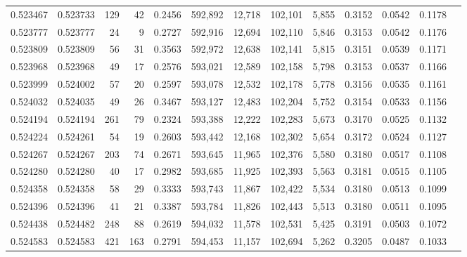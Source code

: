 \begin{tabular}{rrrrrrrrrrrrr}
0.523467 & 0.523733 &   129 &    42 &                                     0.2456 & 592,892 &  12,718 & 102,101 &   5,855 & 0.3152 & 0.0542 & 0.1178 \\
0.523777 & 0.523777 &    24 &     9 &                                     0.2727 & 592,916 &  12,694 & 102,110 &   5,846 & 0.3153 & 0.0542 & 0.1176 \\
0.523809 & 0.523809 &    56 &    31 &                                     0.3563 & 592,972 &  12,638 & 102,141 &   5,815 & 0.3151 & 0.0539 & 0.1171 \\
0.523968 & 0.523968 &    49 &    17 &                                     0.2576 & 593,021 &  12,589 & 102,158 &   5,798 & 0.3153 & 0.0537 & 0.1166 \\
0.523999 & 0.524002 &    57 &    20 &                                     0.2597 & 593,078 &  12,532 & 102,178 &   5,778 & 0.3156 & 0.0535 & 0.1161 \\
0.524032 & 0.524035 &    49 &    26 &                                     0.3467 & 593,127 &  12,483 & 102,204 &   5,752 & 0.3154 & 0.0533 & 0.1156 \\
0.524194 & 0.524194 &   261 &    79 &                                     0.2324 & 593,388 &  12,222 & 102,283 &   5,673 & 0.3170 & 0.0525 & 0.1132 \\
0.524224 & 0.524261 &    54 &    19 &                                     0.2603 & 593,442 &  12,168 & 102,302 &   5,654 & 0.3172 & 0.0524 & 0.1127 \\
0.524267 & 0.524267 &   203 &    74 &                                     0.2671 & 593,645 &  11,965 & 102,376 &   5,580 & 0.3180 & 0.0517 & 0.1108 \\
0.524280 & 0.524280 &    40 &    17 &                                     0.2982 & 593,685 &  11,925 & 102,393 &   5,563 & 0.3181 & 0.0515 & 0.1105 \\
0.524358 & 0.524358 &    58 &    29 &                                     0.3333 & 593,743 &  11,867 & 102,422 &   5,534 & 0.3180 & 0.0513 & 0.1099 \\
0.524396 & 0.524396 &    41 &    21 &                                     0.3387 & 593,784 &  11,826 & 102,443 &   5,513 & 0.3180 & 0.0511 & 0.1095 \\
0.524438 & 0.524482 &   248 &    88 &                                     0.2619 & 594,032 &  11,578 & 102,531 &   5,425 & 0.3191 & 0.0503 & 0.1072 \\
0.524583 & 0.524583 &   421 &   163 &                                     0.2791 & 594,453 &  11,157 & 102,694 &   5,262 & 0.3205 & 0.0487 & 0.1033 \\

\end{tabular}
